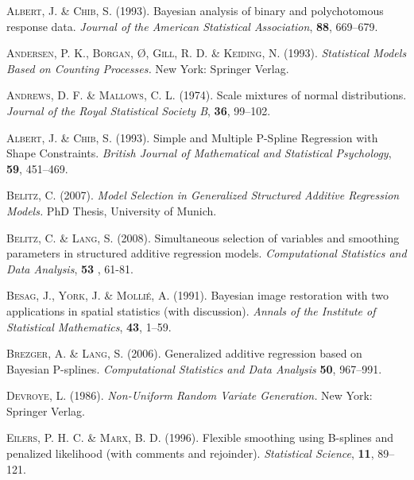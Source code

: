 \documentclass[11pt,a4paper,twoside]{bayesxarticle}
\begin{document}
\begin{thebibliography}{99}

 {\scshape Albert, J. \& Chib, S.} (1993).
 Bayesian analysis of binary and polychotomous response data.
 {\it Journal of the American Statistical Association}, {\bf 88}, 669--679.

 {\scshape Andersen, P. K., Borgan, {\O}, Gill, R. D. \& Keiding, N.} (1993).
 {\it Statistical Models Based on Counting Processes.}
 New York: Springer Verlag.

 {\scshape Andrews, D. F. \& Mallows, C. L.} (1974).
 Scale mixtures of normal distributions.
 {\it Journal of the Royal Statistical Society B}, {\bf 36}, 99--102.

 {\scshape Albert, J. \& Chib, S.} (1993).
 Simple and Multiple P-Spline Regression with Shape Constraints.
 {\it British Journal of Mathematical and Statistical Psychology}, {\bf 59}, 451--469.

 {\scshape Belitz, C.} (2007).
 {\it Model Selection in Generalized Structured Additive Regression Models.}
 PhD Thesis, University of Munich.

{\scshape Belitz, C. \& Lang, S.} (2008).
 Simultaneous selection of variables and smoothing parameters in structured additive regression models.
{\it Computational Statistics and Data Analysis}, {\bf 53} , 61-81.

 {\scshape Besag, J., York, J. \& Molli\'{e}, A.} (1991).
 Bayesian image restoration with two applications in spatial statistics (with discussion).
 {\it Annals of the Institute of Statistical Mathematics}, {\bf 43}, 1--59.

 {\scshape Brezger, A. \& Lang, S.} (2006).
 Generalized additive regression based on Bayesian P-splines.
 {\it Computational Statistics and Data Analysis} {\bf 50}, 967--991.

 {\scshape Devroye, L.} (1986).
 {\it Non-Uniform Random Variate Generation.}
 New York: Springer Verlag.

 {\scshape Eilers, P. H. C. \& Marx, B. D.} (1996).
 Flexible smoothing using B-splines and penalized likelihood (with comments and rejoinder).
 {\it Statistical Science}, {\bf 11}, 89--121.


\end{thebibliography}
\end{document}
